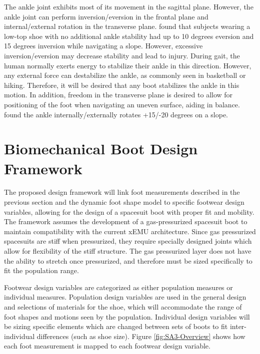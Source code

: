\documentclass[defaultstyle,11pt]{comps}
\begin{document}
The ankle joint exhibits most of its movement in the sagittal plane.
However, the ankle joint can perform inversion/eversion in the frontal plane and internal/external rotation in the transverse plane.
\citep{Wannop2014} found that subjects wearing a low-top shoe with no additional ankle stability had up to 10 degrees eversion and 15 degrees inversion while navigating a slope.
However, excessive inversion/eversion may decrease stability and lead to injury.
During gait, the human normally exerts energy to stabilize their ankle in this direction\citep{OLoughlin2009}.
However, any external force can destabilize the ankle, as commonly seen in basketball or hiking\citep{Bohm2010}.
Therefore, it will be desired that any boot stabilizes the ankle in this motion.
In addition, freedom in the transverse plane is desired to allow for positioning of the foot when navigating an uneven surface, aiding in balance\citep{Wannop2014, Fraser2016a}.
\citep{Wannop2014} found the ankle internally/externally rotates +15/-20 degrees on a slope.

\hypertarget{biomechanical-boot-design-framework}{%
\section{Biomechanical Boot Design Framework}\label{biomechanical-boot-design-framework}}

The proposed design framework will link foot measurements described in the previous section and the dynamic foot shape model to specific footwear design variables, allowing for the design of a spacesuit boot with proper fit and mobility.
The framework assumes the development of a gas-pressurized spacesuit boot to maintain compatibility with the current xEMU architecture.
Since gas pressurized spacesuits are stiff when pressurized, they require specially designed joints which allow for flexibility of the stiff structure.
The gas pressurized layer does not have the ability to stretch once pressurized, and therefore must be sized specifically to fit the population range.

Footwear design variables are categorized as either population measures or individual measures.
Population design variables are used in the general design and selections of materials for the shoe, which will accommodate the range of foot shapes and motions seen by the population.
Individual design variables will be sizing specific elements which are changed between sets of boots to fit inter-individual differences (such as shoe size).
Figure \ref{fig:SA3-Overview} shows how each foot measurement is mapped to each footwear design variable.
\end{document}
